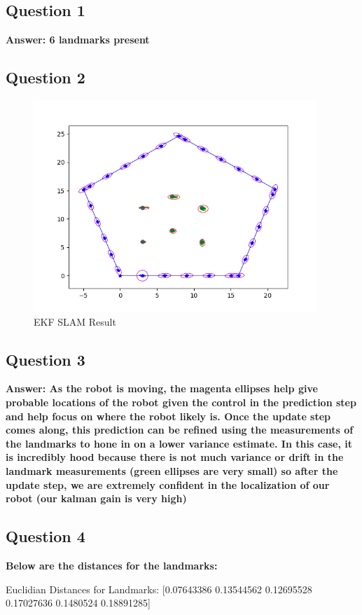 \documentclass[12pt, a4paper]{article}
\begin{document}
\subsection*{Question 1}
\textbf{Answer: 6 landmarks present}
\subsection*{Question 2}
\begin{figure}[!htb]
    \includegraphics[width=0.95\textwidth]{EKF_SLAM_Result.png}
    \caption{EKF SLAM Result}
\end{figure}
\clearpage
\subsection*{Question 3}
\textbf{Answer: As the robot is moving, the magenta ellipses help give probable locations of the robot given the control in the prediction step and help focus on where the robot likely is. Once the update step comes along, this prediction can be refined using the measurements of the landmarks to hone in on a lower variance estimate. In this case, it is incredibly hood because there is not much variance or drift in the landmark measurements (green ellipses are very small) so after the update step, we are extremely confident in the localization of our robot (our kalman gain is very high)}
\subsection*{Question 4}
\textbf{Below are the distances for the landmarks:}

Euclidian Distances for Landmarks: [0.07643386 0.13544562 0.12695528 0.17027636 0.1480524  0.18891285]
\end{document}
